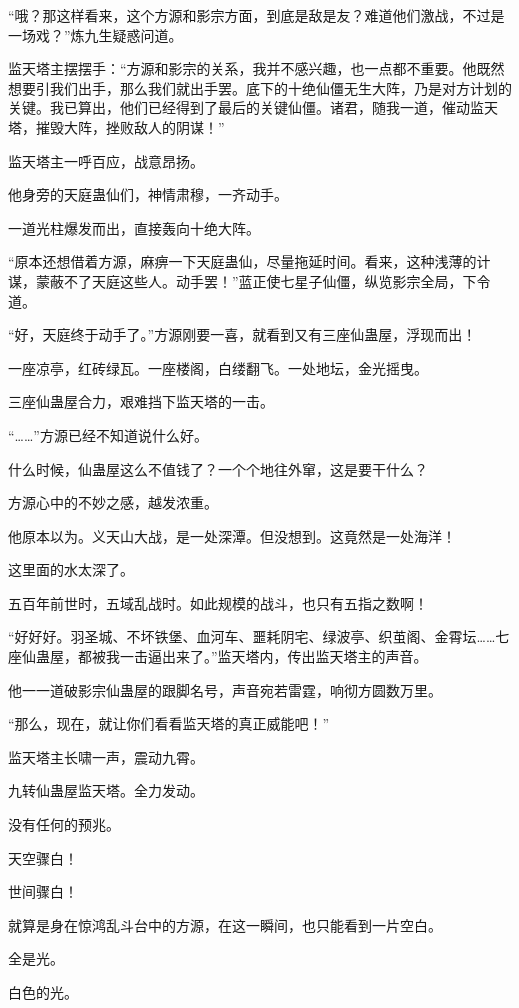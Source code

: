 \begin{this_body}
“哦？那这样看来，这个方源和影宗方面，到底是敌是友？难道他们激战，不过是一场戏？”炼九生疑惑问道。

监天塔主摆摆手：“方源和影宗的关系，我并不感兴趣，也一点都不重要。他既然想要引我们出手，那么我们就出手罢。底下的十绝仙僵无生大阵，乃是对方计划的关键。我已算出，他们已经得到了最后的关键仙僵。诸君，随我一道，催动监天塔，摧毁大阵，挫败敌人的阴谋！”

监天塔主一呼百应，战意昂扬。

他身旁的天庭蛊仙们，神情肃穆，一齐动手。

一道光柱爆发而出，直接轰向十绝大阵。

“原本还想借着方源，麻痹一下天庭蛊仙，尽量拖延时间。看来，这种浅薄的计谋，蒙蔽不了天庭这些人。动手罢！”蓝正使七星子仙僵，纵览影宗全局，下令道。

“好，天庭终于动手了。”方源刚要一喜，就看到又有三座仙蛊屋，浮现而出！

一座凉亭，红砖绿瓦。一座楼阁，白缕翻飞。一处地坛，金光摇曳。

三座仙蛊屋合力，艰难挡下监天塔的一击。

“……”方源已经不知道说什么好。

什么时候，仙蛊屋这么不值钱了？一个个地往外窜，这是要干什么？

方源心中的不妙之感，越发浓重。

他原本以为。义天山大战，是一处深潭。但没想到。这竟然是一处海洋！

这里面的水太深了。

五百年前世时，五域乱战时。如此规模的战斗，也只有五指之数啊！

“好好好。羽圣城、不坏铁堡、血河车、噩耗阴宅、绿波亭、织茧阁、金霄坛……七座仙蛊屋，都被我一击逼出来了。”监天塔内，传出监天塔主的声音。

他一一道破影宗仙蛊屋的跟脚名号，声音宛若雷霆，响彻方圆数万里。

“那么，现在，就让你们看看监天塔的真正威能吧！”

监天塔主长啸一声，震动九霄。

九转仙蛊屋监天塔。全力发动。

没有任何的预兆。

天空骤白！

世间骤白！

就算是身在惊鸿乱斗台中的方源，在这一瞬间，也只能看到一片空白。

全是光。

白色的光。


\end{this_body}
